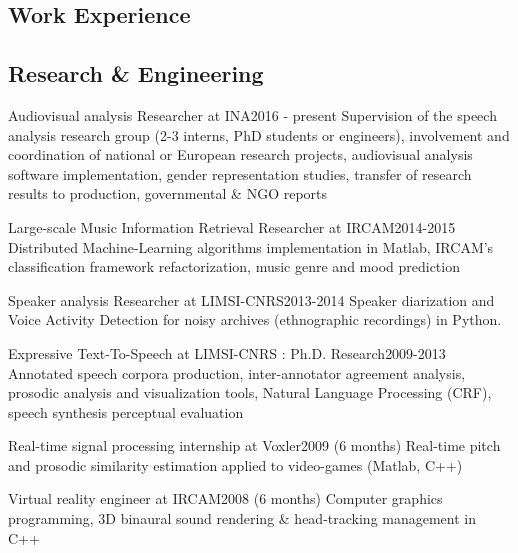 \begin{en}
\section{Work Experience}


\subsection{Research \& Engineering}

\begin{jobshort}{Audiovisual analysis Researcher at INA}{2016 - present}
Supervision of the speech analysis research group (2-3 interns, PhD students or engineers), involvement and coordination of national or European research projects, audiovisual analysis software implementation, gender representation studies, transfer of research results to production, governmental \& NGO reports
\end{jobshort}


\begin{jobshort}{Large-scale Music Information Retrieval Researcher at IRCAM}{2014-2015}
Distributed Machine-Learning algorithms implementation in Matlab, IRCAM’s classification framework refactorization, music genre and mood prediction
\end{jobshort}



\begin{jobshort}{Speaker analysis Researcher at LIMSI-CNRS}{2013-2014}
Speaker diarization and Voice Activity Detection for noisy archives (ethnographic recordings) in Python.
\end{jobshort}



\begin{jobshort}{Expressive Text-To-Speech at LIMSI-CNRS : Ph.D. Research}{2009-2013}
Annotated speech corpora production, inter-annotator agreement analysis, prosodic analysis and visualization tools, Natural Language Processing (CRF), speech synthesis perceptual evaluation
\end{jobshort}



\begin{jobshort}{Real-time signal processing internship at Voxler}{2009 (6 months)}
Real-time pitch and prosodic similarity estimation applied to video-games (Matlab, C++)
\end{jobshort}

\begin{jobshort}{Virtual reality engineer at IRCAM}{2008 (6 months)}
Computer graphics programming, 3D binaural sound rendering \& head-tracking management in C++
\end{jobshort}


\end{en}
